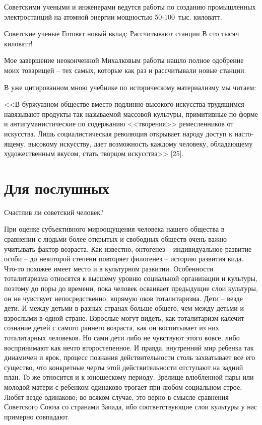 \documentclass{book}
\begin{document}
\begin{minipage}{0.4\textwidth}
Советскими учеными и инженерами ведутся работы по созданию промышленных электростанций на атомной энергии мощностью 50-100~тыс. киловатт.
\end{minipage}
\hfill
\begin{minipage}{0.4\textwidth}
Советские ученые
Готовят новый вклад:
Рассчитывают станции
В сто тысяч киловатт!
\end{minipage}

Мое завершение неоконченной Михалковым работы нашло полное одобрение моих товарищей -- тех самых, которые как раз и рассчитывали 
новые станции.

В уже цитированном мною учебнике по историческому материализму мы читаем:

<<В буржуазном обществе вместо подлинно высокого искусства трудящимся навязывают продукты так называемой массовой культуры, 
примитивные по форме и антигуманистические по содержанию <<творения>> ремесленников от искусства. Лишь социалистическая революция 
открывает народу доступ к насто­ящему, высокому искусству, дает возможность каждому чело­веку, обладающему художественным вкусом, 
стать творцом искусства>> [25].


\section{Для послушных}

Счастлив ли советский человек?

При оценке субъективного мироощущения человека нашего общества в сравнении с людьми более открытых и свободных обществ очень 
важно учитывать фактор возраста. Как известно, онтогенез -- индивидуальное развитие особи -- до некоторой степени повторяет 
филогенез -- историю развития вида. Что-то похожее имеет место и в культурном развитии. Особен­ности тоталитаризма относятся к 
высшему уровню социальной организации и культуры, поэтому до поры до времени, пока человек осваивает предыдущие слои культуры, 
он не чувствует непосредственно, впрямую оков тоталитаризма. Дети -- везде дети. И между детьми в разных странах больше общего, 
чем между детьми и взрослыми в одной стране. Взрослые могут видеть, как тоталитаризм калечит сознание детей с самого раннего 
возраста, как он воспитывает из них тоталитарных человеков. Но сами дети либо не чувствуют этого вовсе, либо воспринимают как 
нечто второстепенное. И правда, внутренний мир ребенка так динамичен и ярок, процесс познания действительности столь захватывает 
все его существо, что конкретные черты этой действительности отступают на задний план. То же относится и к юношескому периоду. 
Зрелище влюбленной пары или молодой матери с ребенком одинаково трогает при любом социальном строе. Любят везде одинаково; во 
всяком случае, это верно в смысле сравнения Советского Союза со странами Запада, ибо соответствующие слои культуры у нас 
примерно совпадают.
\end{document}
